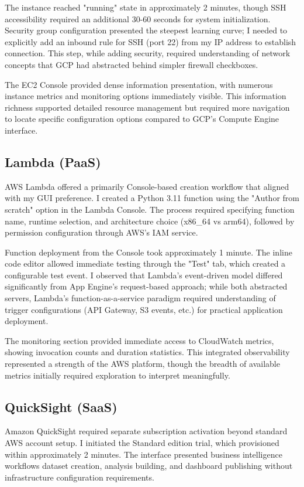 \documentclass[11pt,a4paper]{article}
\begin{document}
The instance reached "running" state in approximately 2 minutes, though SSH accessibility required an additional 30-60 seconds for system initialization. Security group configuration presented the steepest learning curve; I needed to explicitly add an inbound rule for SSH (port 22) from my IP address to establish connection. This step, while adding security, required understanding of network concepts that GCP had abstracted behind simpler firewall checkboxes.

The EC2 Console provided dense information presentation, with numerous instance metrics and monitoring options immediately visible. This information richness supported detailed resource management but required more navigation to locate specific configuration options compared to GCP's Compute Engine interface.

\subsection{Lambda (PaaS)}
AWS Lambda offered a primarily Console-based creation workflow that aligned with my GUI preference. I created a Python 3.11 function using the "Author from scratch" option in the Lambda Console. The process required specifying function name, runtime selection, and architecture choice (x86\_64 vs arm64), followed by permission configuration through AWS's IAM service.

Function deployment from the Console took approximately 1 minute. The inline code editor allowed immediate testing through the "Test" tab, which created a configurable test event. I observed that Lambda's event-driven model differed significantly from App Engine's request-based approach; while both abstracted servers, Lambda's function-as-a-service paradigm required understanding of trigger configurations (API Gateway, S3 events, etc.) for practical application deployment.

The monitoring section provided immediate access to CloudWatch metrics, showing invocation counts and duration statistics. This integrated observability represented a strength of the AWS platform, though the breadth of available metrics initially required exploration to interpret meaningfully.

\subsection{QuickSight (SaaS)}
Amazon QuickSight required separate subscription activation beyond standard AWS account setup. I initiated the Standard edition trial, which provisioned within approximately 2 minutes. The interface presented business intelligence workflows dataset creation, analysis building, and dashboard publishing without infrastructure configuration requirements.
\end{document}

